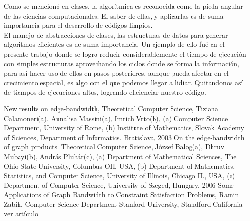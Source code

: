 \documentclass[oneside,onecolumn]{article}
\begin{document}
Como se mencionó en clases, la algorítmica es reconocida como la pieda angular de las ciencias computacionales. El saber de ellas, y aplicarlas es de suma importancia para el desarrollo de códigos limpios.\\

El manejo de abstracciones de clases, las estructuras de datos para generar algoritmos eficientes es de suma importancia. Un ejemplo de ello fué en el presente trabajo donde se logró reducir considerablemente el tiempo de ejecución con simples estructuras aprovechando los ciclos donde se forma la información, para así hacer uso de ellos en pasos posteriores, aunque pueda afectar en el crecimiento espacial, es algo con el que podemos llegar a lidiar. Quitandonos así de tiempos de ejecuciones altos, logrando eficienciar nuestro código.

\newpage
\begin{thebibliography}{0} %
 New results on edge-bandwidth, Theoretical Computer Science, Tiziana Calamoneri(a), Annalisa Massini(a), Imrich Vrto(b), (a) Computer Science Department, University of Rome, (b) Institute of Mathematics, Slovak Academy of Sciences, Department of Informatics, Bratislava, 2003
 On the edge-bandwidth of graph products, Theoretical Computer Science, József Balog(a), Dhruv Mubayi(b), András Pluhár(c), (a) Department of Mathematical Sciences, The Ohio State University, Columbus OH, USA, (b) Department of Mathematics, Statistics, and Computer Science, University of Illinois, Chicago IL, USA, (c) Department of Computer Science, University of Szeged, Hungary, 2006
 Some Applications of Graph Bandwidth to Constraint Satisfaction Problems, Ramin Zabih, Computer Science Department Stanford University, Standford California \href{https://www.cs.cornell.edu/~rdz/Papers/Z-AAAI90.pdf}{ver artículo}
  
\end{thebibliography}

\end{document}

